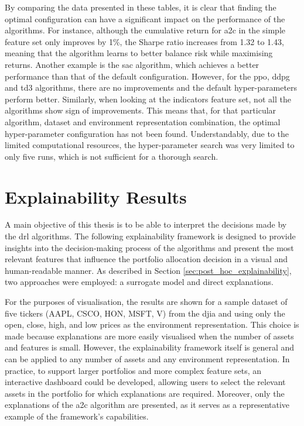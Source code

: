 By comparing the data presented in these tables, it is clear that finding the optimal configuration can have a significant impact on the performance of the algorithms. For instance, although the cumulative return for \acrshort{a2c} in the simple feature set only improves by 1\%, the Sharpe ratio increases from 1.32 to 1.43, meaning that the algorithm learns to better balance risk while maximising returns. Another example is the \acrshort{sac} algorithm, which achieves a better performance than that of the default configuration. However, for the \acrshort{ppo}, \acrshort{ddpg} and \acrshort{td3} algorithms, there are no improvements and the default hyper-parameters perform better. Similarly, when looking at the indicators feature set, not all the algorithms show sign of improvements. This means that, for that particular algorithm, dataset and environment representation combination, the optimal hyper-parameter configuration has not been found. Understandably, due to the limited computational resources, the hyper-parameter search was very limited to only five runs, which is not sufficient for a thorough search.

\section{Explainability Results} \label{sec:explainability-framework}

A main objective of this thesis is to be able to interpret the decisions made by the \acrshort{drl} algorithms. The following explainability framework is designed to provide insights into the decision-making process of the algorithms and present the most relevant features that influence the portfolio allocation decision in a visual and human-readable manner. As described in Section \ref{sec:post_hoc_explainability}, two approaches were employed: a surrogate model and direct explanations. 

For the purposes of visualisation, the results are shown for a sample dataset of five tickers (AAPL, CSCO, HON, MSFT, V) from the \acrshort{djia} and using only the open, close, high, and low prices as the environment representation. This choice is made because explanations are more easily visualised when the number of assets and features is small. However, the explainability framework itself is general and can be applied to any number of assets and any environment representation. In practice, to support larger portfolios and more complex feature sets, an interactive dashboard could be developed, allowing users to select the relevant assets in the portfolio for which explanations are required. Moreover, only the explanations of the \acrshort{a2c} algorithm are presented, as it serves as a representative example of the framework's capabilities.

